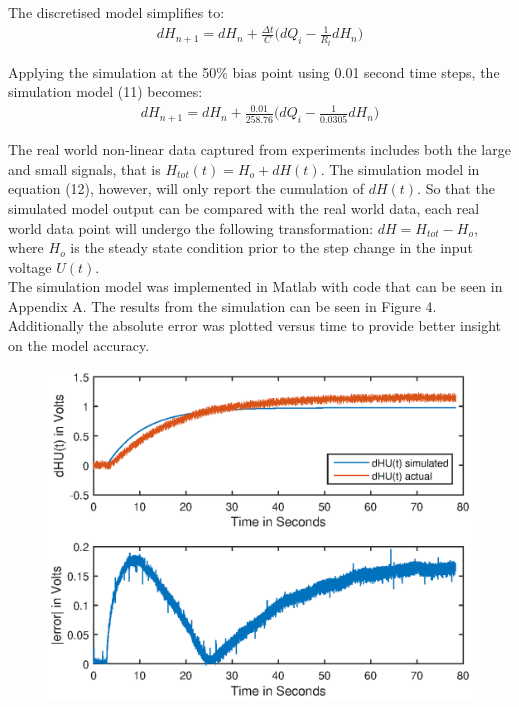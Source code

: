 \documentclass{article}
\begin{document}
The discretised model simplifies to:
\begin{align}
	dH_{n+1} = dH_{n} + \frac{\Delta t}{C} \big(dQ_i - \frac{1}{R_{t}}dH_n\big)
\end{align}

Applying the simulation at the 50\% bias point using 0.01 second time steps, the simulation model (11) becomes:
\begin{align}
dH_{n+1} = dH_{n} + \frac{0.01}{258.76} \big(dQ_i - \frac{1}{0.0305}dH_n\big)
\end{align}

The real world non-linear data captured from experiments includes both the large and small signals, that is $H_{tot}(t) = H_o + dH(t)$. The simulation model in equation (12), however, will only report the cumulation of $dH(t)$. So that the simulated model output can be compared with the real world data, each real world data point will undergo the following transformation: $dH = H_{tot} - H_o$, where $H_o$ is the steady state condition prior to the step change in the input voltage $U(t)$.\\

The simulation model was implemented in Matlab with code that can be seen in Appendix A. The results from the simulation can be seen in Figure 4. Additionally the absolute error was plotted versus time to provide better insight on the model accuracy.

\begin{figure}[H]
	\centering
	\includegraphics[scale=0.8]{fig3.eps}
\end{figure}
\end{document}
